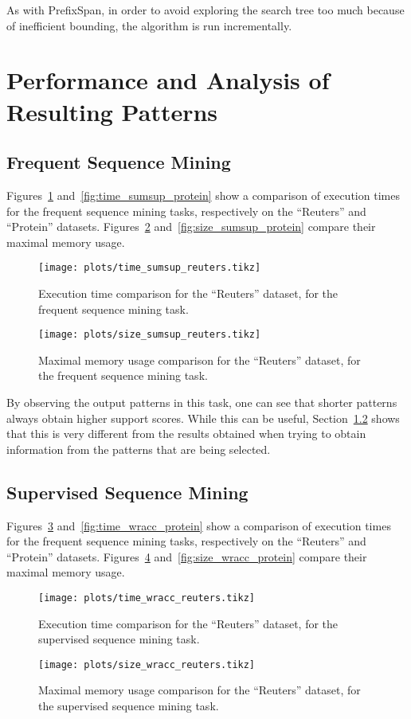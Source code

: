 \documentclass{sigkddExp}
\newcommand{\ps}{\textsf{PrefixSpan}}
\begin{document}
As with \ps, in order to avoid exploring the search tree too much because of inefficient bounding, the algorithm is run incrementally.

\section{Performance and Analysis of Resulting Patterns}
\subsection{Frequent Sequence Mining}
Figures~\ref{fig:time_sumsup_reuters} and~\ref{fig:time_sumsup_protein} show a comparison of execution times for the frequent sequence mining tasks, respectively on the ``Reuters'' and ``Protein'' datasets.
Figures~\ref{fig:size_sumsup_reuters} and~\ref{fig:size_sumsup_protein} compare their maximal memory usage.
\begin{figure}[!hbtp]
	\centering
	\texttt{[image: plots/time\_sumsup\_reuters.tikz]}
	\caption{Execution time comparison for the ``Reuters'' dataset, for the frequent sequence mining task.}
	\label{fig:time_sumsup_reuters}
\end{figure}%
\begin{figure}[!hbtp]
	\centering
	\texttt{[image: plots/size\_sumsup\_reuters.tikz]}
	\caption{Maximal memory usage comparison for the ``Reuters'' dataset, for the frequent sequence mining task.}
	\label{fig:size_sumsup_reuters}
\end{figure}

By observing the output patterns in this task, one can see that shorter patterns always obtain higher support scores.
While this can be useful, Section~\ref{sec:perf_ssm} shows that this is very different from the results obtained when trying to obtain information from the patterns that are being selected.
\subsection{Supervised Sequence Mining}
\label{sec:perf_ssm}
Figures~\ref{fig:time_wracc_reuters} and~\ref{fig:time_wracc_protein} show a comparison of execution times for the frequent sequence mining tasks, respectively on the ``Reuters'' and ``Protein'' datasets.
Figures~\ref{fig:size_wracc_reuters} and~\ref{fig:size_wracc_protein} compare their maximal memory usage.
\begin{figure}[!hbtp]
	\centering
	\texttt{[image: plots/time\_wracc\_reuters.tikz]}
	\caption{Execution time comparison for the ``Reuters'' dataset, for the supervised sequence mining task.}
	\label{fig:time_wracc_reuters}
\end{figure}%
\begin{figure}[!hbtp]
	\centering
	\texttt{[image: plots/size\_wracc\_reuters.tikz]}
	\caption{Maximal memory usage comparison for the ``Reuters'' dataset, for the supervised sequence mining task.}
	\label{fig:size_wracc_reuters}
\end{figure}
\end{document}

